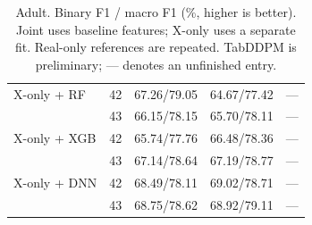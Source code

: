 \begin{table}[ht]
{\begin{tabular}{lrrrr}
X-only + RF & 42 & 67.26/79.05 & 64.67/77.42 & --- \\
 & 43 & 66.15/78.15 & 65.70/78.11 & --- \\
X-only + XGB & 42 & 65.74/77.76 & 66.48/78.36 & --- \\
 & 43 & 67.14/78.64 & 67.19/78.77 & --- \\
X-only + DNN & 42 & 68.49/78.11 & 69.02/78.71 & --- \\
 & 43 & 68.75/78.62 & 68.92/79.11 & --- \\
\bottomrule
\end{tabular}
}
\caption{Adult. Binary F1 / macro F1 (\%, higher is better). Joint uses baseline features; X-only uses a separate fit. Real-only references are repeated. TabDDPM is preliminary; --- denotes an unfinished entry.}
\label{tab:adult}
\end{table}
